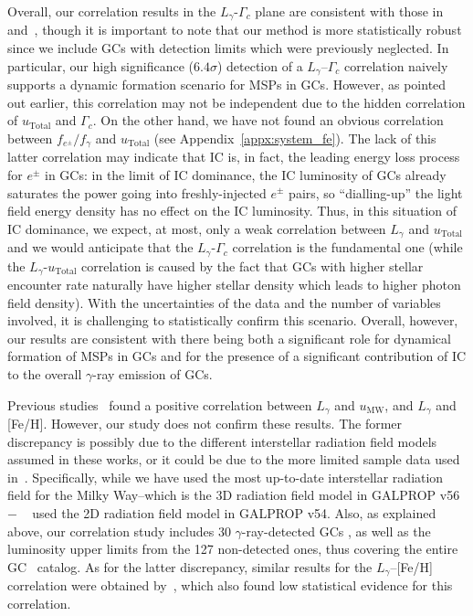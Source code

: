 \documentclass[doublespace,draft,nopageskip]{VTthesis} %
\begin{document}
Overall, our correlation results in the $L_\gamma$-$\Gamma_c$ plane are consistent with those in \citet{2011ApJ...726..100H} and~\citet{2019MNRAS.486..851D}, though it is important to note that our method is more statistically robust since we include GCs with detection limits which were previously neglected. In particular, our high significance ($6.4\sigma$) detection of a $L_\gamma$--$\Gamma_c$ correlation naively supports a dynamic formation scenario for MSPs in GCs. However, as pointed out earlier, this correlation may not be independent due to the hidden correlation of $u_\mathrm{Total}$ and $\Gamma_c$. On the other hand, we have not found an obvious correlation between $f_{e^\pm}/f_\gamma$ and $u_\mathrm{Total}$ (see Appendix~\ref{appx:system_fe}). The lack of this latter correlation may indicate that IC is, in fact, the leading energy loss process for $e^\pm$ in GCs: in the limit of IC dominance, the IC luminosity of GCs already saturates the power going into freshly-injected $e^\pm$ pairs, so ``dialling-up'' the light field energy density has no effect on the IC luminosity. Thus, in this situation of IC dominance, we expect, at most, only a weak correlation between $L_\gamma$ and $u_\mathrm{Total}$ and we would anticipate that the $L_\gamma$-$\Gamma_c$ correlation is the fundamental one (while the $L_\gamma$-$u_\mathrm{Total}$ correlation is caused by the fact that GCs with higher stellar encounter rate naturally have higher stellar density which leads to higher photon field density). With the uncertainties of the data and the number of variables involved, it is challenging to statistically confirm this scenario. Overall, however, our results are consistent with there being both a significant role for dynamical formation of MSPs in GCs and for the presence of a significant contribution of IC to the overall $\gamma$-ray emission of GCs.

Previous studies~\citep{2011ApJ...726..100H} found a positive correlation between $L_\gamma$ and $u_\mathrm{MW}$, and $L_\gamma$ and [Fe/H]. However, our study does not confirm these results. The former discrepancy is possibly due to the different interstellar radiation field models assumed in these works, or it could be due to the more limited sample data used in~\cite{2011ApJ...726..100H}. Specifically, while we have used the most up-to-date interstellar radiation field for the Milky Way--which is the 3D radiation field model in GALPROP v56~\citep{2017ApJ...846...67P}$-$ ~\citet{2011ApJ...726..100H} used the 2D radiation field model in GALPROP v54. Also, as explained above, our correlation study includes 30 $\gamma$-ray-detected GCs , as well as the luminosity upper limits from the 127 non-detected ones, thus covering the entire GC~\citet{1996AJ....112.1487H} catalog. As for the latter discrepancy, similar results for the $L_\gamma$--[Fe/H] correlation were obtained by~\citet{2019MNRAS.486..851D}, which also found low statistical evidence for this correlation.
\end{document}
